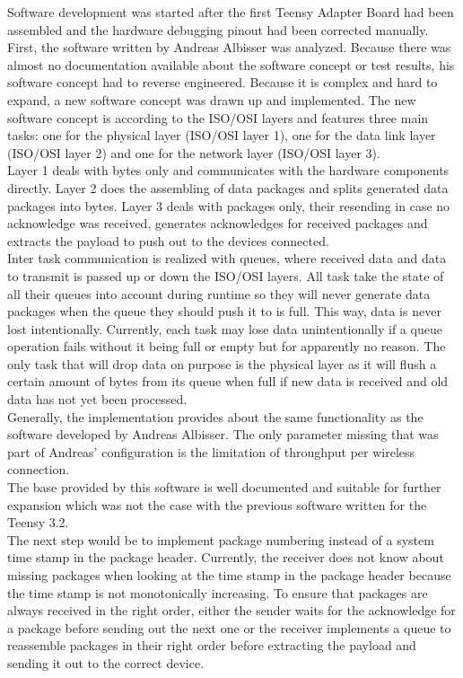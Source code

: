 Software development was started after the first Teensy Adapter Board had been assembled and the hardware debugging pinout had been corrected manually. First, the software written by Andreas Albisser was analyzed. Because there was almost no documentation available about the software concept or test results, his software concept had to reverse engineered. Because it is complex and hard to expand, a new software concept was drawn up and implemented. The new software concept is according to the ISO/OSI layers and features three main tasks: one for the physical layer (ISO/OSI layer 1), one for the data link layer (ISO/OSI layer 2) and one for the network layer (ISO/OSI layer 3).\\
Layer 1 deals with bytes only and communicates with the hardware components directly. Layer 2 does the assembling of data packages and splits generated data packages into bytes. Layer 3 deals with packages only, their resending in case no acknowledge was received, generates acknowledges for received packages and extracts the payload to push out to the devices connected.\\
Inter task communication is realized with queues, where received data and data to transmit is passed up or down the ISO/OSI layers. All task take the state of all their queues into account during runtime so they will never generate data packages when the queue they should push it to is full. This way, data is never lost intentionally. Currently, each task may lose data unintentionally if a queue operation fails without it being full or empty but for apparently no reason. The only task that will drop data on purpose is the physical layer as it will flush a certain amount of bytes from its queue when full if new data is received and old data has not yet been processed.\\
Generally, the implementation provides about the same functionality as the software developed by Andreas Albisser. The only parameter missing that was part of Andreas' configuration is the limitation of throughput per wireless connection.\\
The base provided by this software is well documented and suitable for further expansion which was not the case with the previous software written for the Teensy 3.2.\\
The next step would be to implement package numbering instead of a system time stamp in the package header. Currently, the receiver does not know about missing packages when looking at the time stamp in the package header because the time stamp is not monotonically increasing. To ensure that packages are always received in the right order, either the sender waits for the acknowledge for a package before sending out the next one or the receiver implements a queue to reassemble packages in their right order before extracting the payload and sending it out to the correct device.\\
